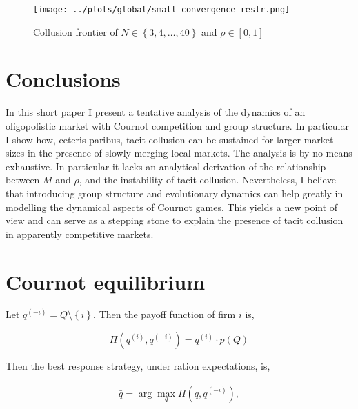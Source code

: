 \documentclass[american]{scrartcl}
\newcommand{\set}[1]{\left\{#1\right\}}
\begin{document}
\begin{figure}[H]
    \center
    \texttt{[image: ../plots/global/small\_convergence\_restr.png]}
    \caption{Collusion frontier of $N \in \set{3, 4, \ldots, 40}$ and $\rho \in [0, 1]$ }
    \label{fig:frontier}
\end{figure}

\section{Conclusions}

In this short paper I present a tentative analysis of the dynamics of an oligopolistic market with Cournot competition and group structure. In particular I show how, ceteris paribus, tacit collusion can be sustained for larger market sizes in the presence of slowly merging local markets. The analysis is by no means exhaustive. In particular it lacks an analytical derivation of the relationship between $M$ and $\rho$, and the instability of tacit collusion. Nevertheless, I believe that introducing group structure and evolutionary dynamics can help greatly in modelling the dynamical aspects of Cournot games. This yields a new point of view and can serve as a stepping stone to explain the presence of tacit collusion in apparently competitive markets.

\newpage
\nocite{*}
\printbibliography

\newpage
\appendix

\section{Cournot equilibrium} \label{A:cournot}

Let $q^{(-i)} = Q \setminus \set{i}$. Then the payoff function of firm $i$ is,

\begin{equation*}
    \Pi\left(q^{(i)}, q^{(-i)} \right) = q^{(i)} \cdot p(Q)
\end{equation*}

Then the best response strategy, under ration expectations, is,

\begin{equation*}
    \begin{split}
        \bar{q} = \arg\max_{q} \Pi\left(q, q^{(-i)} \right),
    \end{split}
\end{equation*}
\end{document}
